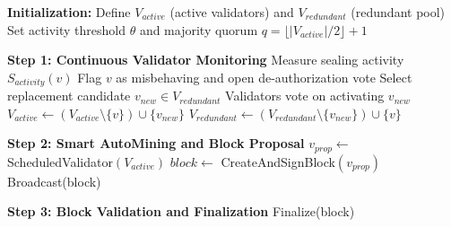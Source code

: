 \cite{cho2010survey}\documentclass[journal,comsoc,twoside]{IEEEtran}
\begin{document}
\begin{algorithm}[!htbp]
\caption{\textcolor{black}{PoA$^2$ Consensus Algorithm for PureChain}}
\label{poa2}
\small
{\color{black}
\begin{algorithmic}[1]

    \State \textbf{Initialization:} Define $V_{active}$ (active validators) and $V_{redundant}$ (redundant pool)
    \State Set activity threshold $\theta$ and majority quorum $q = \lfloor |V_{active}|/2 \rfloor + 1$


        \State \textbf{Step 1: Continuous Validator Monitoring}
            \State Measure sealing activity $S_{activity}(v)$
                \State Flag $v$ as misbehaving and open de-authorization vote
                \State Select replacement candidate $v_{new} \in V_{redundant}$
                \State Validators vote on activating $v_{new}$
                    \State $V_{active} \gets (V_{active} \setminus \{v\}) \cup \{v_{new}\}$
                    \State $V_{redundant} \gets (V_{redundant} \setminus \{v_{new}\}) \cup \{v\}$
                \EndIf
            \EndIf
        \EndFor

        \State \textbf{Step 2: Smart AutoMining and Block Proposal}
            \State $v_{prop} \gets$ ScheduledValidator$(V_{active})$
            \State $block \gets$ CreateAndSignBlock$(v_{prop})$
            \State Broadcast(block)
        \EndIf

        \State \textbf{Step 3: Block Validation and Finalization}
                \State Finalize(block)
            \EndIf
        \EndIf

    \EndWhile
\EndProcedure

\end{algorithmic}
}
\end{algorithm}
\end{document}

